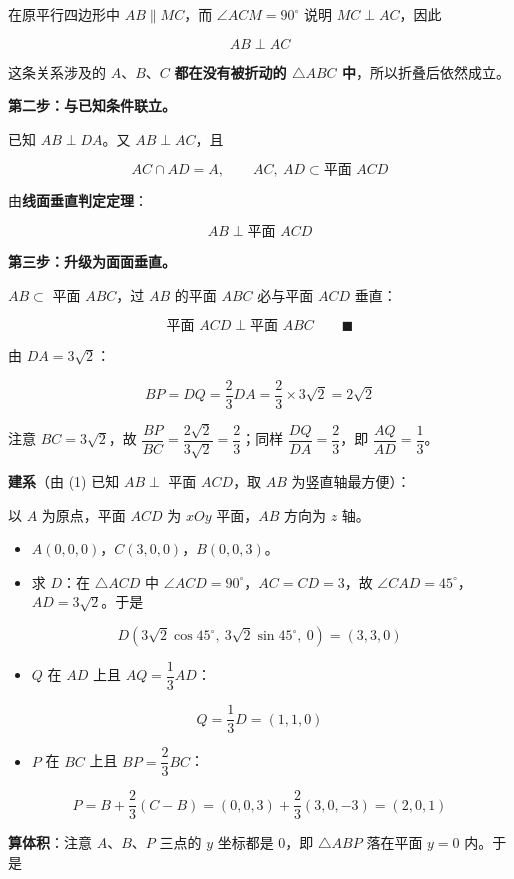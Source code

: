 在原平行四边形中 $AB\parallel MC$，而 $\angle ACM=90^\circ$ 说明 $MC\perp AC$，因此

\[AB\perp AC\]

这条关系涉及的 $A$、$B$、$C$ \textbf{都在没有被折动的 $\triangle ABC$ 中}，所以折叠后依然成立。

\textbf{第二步：与已知条件联立。}

已知 $AB\perp DA$。又 $AB\perp AC$，且

\[AC\cap AD=A,\qquad AC,\ AD\subset\text{平面 }ACD\]

由\textbf{线面垂直判定定理}：

\[AB\perp\text{平面 }ACD\]

\textbf{第三步：升级为面面垂直。}

$AB\subset$ 平面 $ABC$，过 $AB$ 的平面 $ABC$ 必与平面 $ACD$ 垂直：

\[\text{平面 }ACD\perp\text{平面 }ABC\qquad\blacksquare\]


由 $DA=3\sqrt2$：

\[BP=DQ=\frac23DA=\frac23\times3\sqrt2=2\sqrt2\]

注意 $BC=3\sqrt2$，故 $\dfrac{BP}{BC}=\dfrac{2\sqrt2}{3\sqrt2}=\dfrac23$；同样 $\dfrac{DQ}{DA}=\dfrac23$，即 $\dfrac{AQ}{AD}=\dfrac13$。

\textbf{建系}（由 (1) 已知 $AB\perp$ 平面 $ACD$，取 $AB$ 为竖直轴最方便）：

以 $A$ 为原点，平面 $ACD$ 为 $xOy$ 平面，$AB$ 方向为 $z$ 轴。

\begin{itemize}
\item $A(0,0,0)$，$C(3,0,0)$，$B(0,0,3)$。
\item 求 $D$：在 $\triangle ACD$ 中 $\angle ACD=90^\circ$，$AC=CD=3$，故 $\angle CAD=45^\circ$，$AD=3\sqrt2$。于是
\end{itemize}
\[D\left(3\sqrt2\cos45^\circ,\ 3\sqrt2\sin45^\circ,\ 0\right)=(3,3,0)\]
\begin{itemize}
\item $Q$ 在 $AD$ 上且 $AQ=\dfrac13AD$：
\end{itemize}
\[Q=\frac13D=(1,1,0)\]
\begin{itemize}
\item $P$ 在 $BC$ 上且 $BP=\dfrac23BC$：
\end{itemize}
\[P=B+\frac23\left(C-B\right)=(0,0,3)+\frac23(3,0,-3)=(2,0,1)\]

\textbf{算体积}：注意 $A$、$B$、$P$ 三点的 $y$ 坐标都是 $0$，即 $\triangle ABP$ 落在平面 $y=0$ 内。于是

